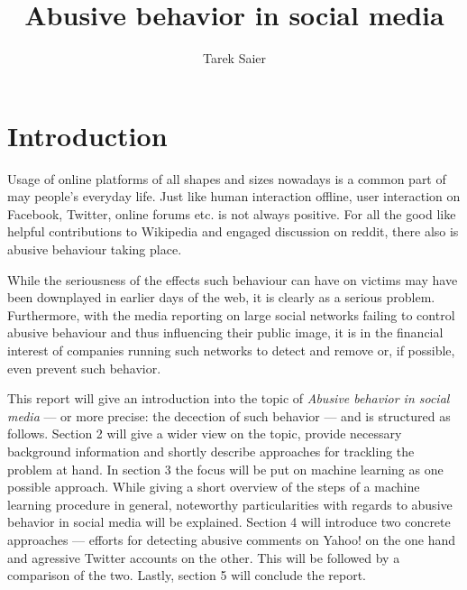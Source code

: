\documentclass{proseminar}
\begin{document}

\title{Abusive behavior in social media}

\author{
Tarek Saier\\
}

\maketitle

\section{Introduction}
Usage of online platforms of all shapes and sizes nowadays is a common part of may people's everyday life. Just like human interaction offline, user interaction on Facebook, Twitter, online forums etc. is not always positive. For all the good like helpful contributions to Wikipedia and engaged discussion on reddit, there also is abusive behaviour taking place.

While the seriousness of the effects such behaviour can have on victims may have been downplayed in earlier days of the web, it is clearly as a serious problem. Furthermore, with the media reporting on large social networks failing to control abusive behaviour and thus influencing their public image, it is in the financial interest of companies running such networks to detect and remove or, if possible, even prevent such behavior.

This report will give an introduction into the topic of \emph{Abusive behavior in social media} --- or more precise: the decection of such behavior --- and is structured as follows. Section 2 will give a wider view on the topic, provide necessary background information and shortly describe approaches for trackling the problem at hand. In section 3 the focus will be put on machine learning as one possible approach. While giving a short overview of the steps of a machine learning procedure in general, noteworthy particularities with regards to abusive behavior in social media will be explained. Section 4 will introduce two concrete approaches --- efforts for detecting abusive comments on Yahoo! on the one hand and agressive Twitter accounts on the other. This will be followed by a comparison of the two. Lastly, section 5 will conclude the report.
\end{document}
